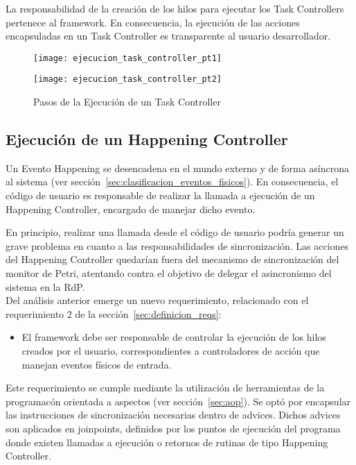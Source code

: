 La responsabilidad de la creación de los hilos para ejecutar los Task
Controllers pertenece al framework. En consecuencia, la ejecución de las
acciones encapsuladas en un Task Controller es transparente al usuario
desarrollador.

\begin{figure}[H]
	\centering
	\texttt{[image: ejecucion\_task\_controller\_pt1]}
\end{figure}
\begin{figure}[H]
	\centering
	\texttt{[image: ejecucion\_task\_controller\_pt2]}
	\caption{Pasos de la Ejecución de un Task Controller}
	\label{fig:ejecucion_task_controller}
\end{figure}

\newpage

\subsection{Ejecución de un Happening Controller}
\label{sec:ejecucion_happening_controller}
Un Evento Happening se desencadena en el mundo externo y de forma asíncrona al
sistema (ver sección~\ref{sec:clasificacion_eventos_fisicos}). 
En consecuencia, el código de usuario es responsable de realizar la llamada a
ejecución de un Happening Controller, encargado de manejar dicho evento.

En principio, realizar una llamada desde el código de usuario podría generar un
grave problema en cuanto a las responsabilidades de sincronización. Las
acciones del Happening Controller quedarían fuera del mecanismo de
sincronización del monitor de Petri, atentando contra el objetivo de delegar
el asincronismo del sistema en la RdP. \\

Del análisis anterior emerge un nuevo requerimiento, relacionado con el
requerimiento 2 de la sección~\ref{sec:definicion_reqs}:
    \begin{itemize}
        \item El framework debe ser responsable de controlar la ejecución de los
        hilos creados por el usuario, correspondientes a controladores de acción
        que manejan eventos físicos de entrada.
    \end{itemize}

Este requerimiento se cumple mediante la utilización de herramientas de la
programacón orientada a aspectos (ver sección~\ref{sec:aop}). Se optó por
encapsular las instrucciones de sincronización necesarias dentro de advices.
Dichos advices son aplicados en joinpoints, definidos por los puntos de
ejecución del programa donde existen llamadas a ejecución o retornos de
rutinas de tipo Happening Controller.

